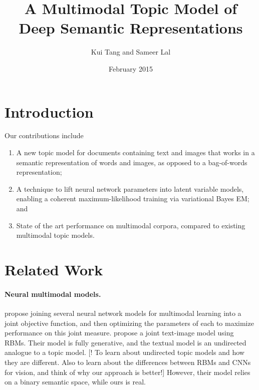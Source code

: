 \documentclass[english]{article}
\title{A Multimodal Topic Model of Deep Semantic Representations}
\author{Kui Tang and Sameer Lal}
\date{February 2015}
\begin{document}
\maketitle

\section{Introduction}

Our contributions include
\begin{enumerate}
\item A new topic model for documents containing text and images that works in a semantic representation of words and images, as opposed to a bag-of-words representation;
\item A technique to lift neural network parameters into latent variable models, enabling a coherent maximum-likelihood training via variational Bayes EM; and
\item State of the art performance on multimodal corpora, compared to existing multimodal topic models. 
\end{enumerate}

\section{Related Work}

\paragraph{Neural multimodal models.}
\citet{Lecun98} propose joining several neural network models for multimodal learning into a joint objective function, and then optimizing the parameters of each to maximize performance on this joint measure. \citet{Srivastava14} propose a joint text-image model using RBMs. Their model is fully generative, and the textual model is an undirected analogue to a topic model. [! To learn about undirected topic models and how they are different. Also to learn about the differences between RBMs and CNNs for vision, and think of why our approach is better!] However, their model relies on a binary semantic space, while ours is real.
\end{document}
